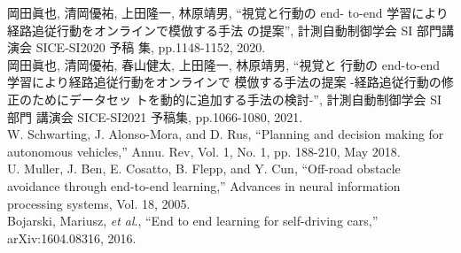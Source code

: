\documentclass{jsarticle}
\begin{document}
\vspace*{8mm}
\begin{thebibliography}{99}
  \vspace*{4mm}
  \small
  岡田眞也, 清岡優祐, 上田隆一, 林原靖男, “視覚と行動の end-
  to-end 学習により経路追従行動をオンラインで模倣する手法
  の提案”, 計測自動制御学会 SI 部門講演会 SICE-SI2020 予稿
  集, pp.1148-1152, 2020.\\
  
  岡田眞也, 清岡優祐, 春山健太, 上田隆一, 林原靖男, “視覚と
  行動の end-to-end 学習により経路追従行動をオンラインで
  模倣する手法の提案 -経路追従行動の修正のためにデータセッ
  トを動的に追加する手法の検討-”, 計測自動制御学会 SI 部門
  講演会 SICE-SI2021 予稿集, pp.1066-1080, 2021.\\
  
  W. Schwarting, J. Alonso-Mora, and D. Rus,
  “Planning and decision making for
  autonomous vehicles,” Annu. Rev, Vol. 1, No. 1, pp. 188-210, May 2018.\\
  
  U. Muller, J. Ben, E. Cosatto, B. Flepp, and Y. Cun, “Oﬀ-road obstacle avoidance
  through end-to-end learning,” Advances in neural information processing systems,
  Vol. 18, 2005.\\
  
  Bojarski, Mariusz, \textit{et al}.,
  “End to end learning for self-driving cars,” arXiv:1604.08316, 2016.\\

\end{thebibliography}
\end{document}
